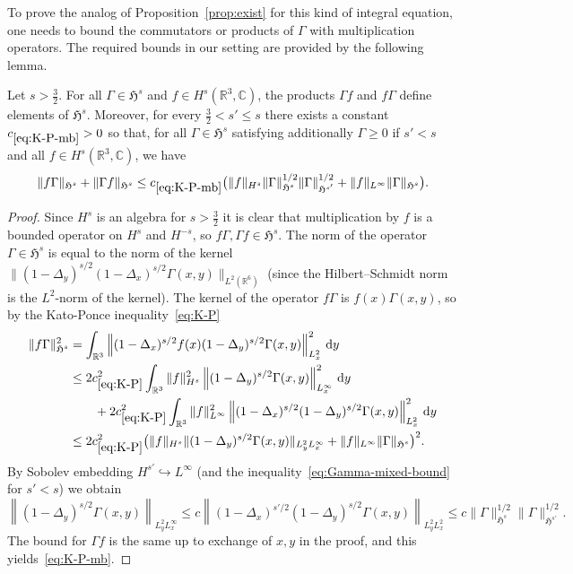 \documentclass[AHL,Unicode,longabstracts,published]{cedram}
\newcommand\R{\mathbb{R}}
\newcommand\C{\mathbb{C}}
\newcommand{\gH}{\mathfrak{H}}
\renewcommand\d[1]{{\ensuremath{\,\text{d}#1}}}
\begin{document}
To prove the analog of Proposition~\ref{prop:exist} for this kind of integral equation, one needs to bound the commutators or products of $\Gamma$ with multiplication operators. The required bounds in our setting are provided by the following lemma.

\begin{lemm}\label{lem:K-P-mb}
Let $s>\tfrac32$. For all $\Gamma\in \gH^s$ and $f\in H^s(\R^3, \C)$, the products $\Gamma f$ and $f\Gamma$ define elements of $ \gH^s$. Moreover, for every $\tfrac32<s'\leq s$ there exists a constant $c_{\eqref{eq:K-P-mb}}>0$ so that, for all $\Gamma\in \gH^s$ satisfying additionally $\Gamma \geq 0$ if $s'<s$ and all $f\in H^s(\R^3, \C)$, we have
\begin{equation}\label{eq:K-P-mb}
\| f\Gamma \|_{\gH^s} + \| \Gamma f\|_{\gH^s}\leq c_{\eqref{eq:K-P-mb}} \big(\|f\|_{H^s} \|\Gamma\|_{\gH^s}^{1/2} \|\Gamma\|_{\gH^{s'}}^{1/2} + \|f\|_{L^\infty} \|\Gamma\|_{\gH^s} \big).
\end{equation}
\end{lemm}

\begin{proof}
Since $H^s$ is an algebra for $s>\tfrac32$ it is clear that multiplication by $f$ is a bounded operator on $H^s$ and $H^{-s}$, so $f\Gamma, \Gamma f \in \gH^s$. The norm of the operator $\Gamma\in \gH^s$ is equal to the norm of the kernel $\|(1-\Delta_y)^{s/2}(1-\Delta_x)^{s/2}\Gamma(x,y)\|_{L^2(\R^6)}$ (since the Hilbert--Schmidt norm is the $L^2$-norm of the kernel). The kernel of the operator $f\Gamma$ is $f(x)\Gamma(x,y)$, so by the Kato-Ponce inequality~\eqref{eq:K-P}
\begin{align*}
\| f\Gamma \|_{\gH^s}^2 & = \int_{\R^3} \left\|(1-\Delta_x)^{s/2}f(x)(1-\Delta_y)^{s/2}\Gamma(x,y)\right\|_{L^2_x}^2 \d y\\
&\leq 2c_{\eqref{eq:K-P}}^2 \int_{\R^3}\|f\|_{H^s}^2 \left\|(1-\Delta_y)^{s/2}\Gamma(x,y)\right\|_{L^\infty_x}^2 \d y \\
&\qquad + 2c_{\eqref{eq:K-P}}^2 \int_{\R^3}\|f\|_{L^\infty}^2\left\|(1-\Delta_x)^{s/2}(1-\Delta_y)^{s/2}\Gamma(x,y)\right\|_{L^2_x}^2 \d y \\
&\leq 2c_{\eqref{eq:K-P}}^2 \big(\|f\|_{H^s} \|(1-\Delta_y)^{s/2}\Gamma(x,y)\|_{L^2_yL^\infty_x} + \|f\|_{L^\infty} \|\Gamma\|_{\gH^s} \big)^2.
\end{align*}
By Sobolev embedding $H^{s'}\hookrightarrow L^\infty$ (and the inequality~\eqref{eq:Gamma-mixed-bound} for $s'<s$) we obtain
\begin{equation*}
\left\|(1-\Delta_y)^{s/2}\Gamma(x,y)\right\|_{L^2_yL^\infty_x} \leq c \left\|(1-\Delta_x)^{s'/2}(1-\Delta_y)^{s/2}\Gamma(x,y)\right\|_{L^2_yL^2_x} \leq c \|\Gamma\|_{\gH^s}^{1/2} \|\Gamma\|_{\gH^{s'}}^{1/2}.
\end{equation*}
The bound for $\Gamma f$ is the same up to exchange of $x, y$ in the proof, and this yields~\eqref{eq:K-P-mb}.
\end{proof}
\end{document}
